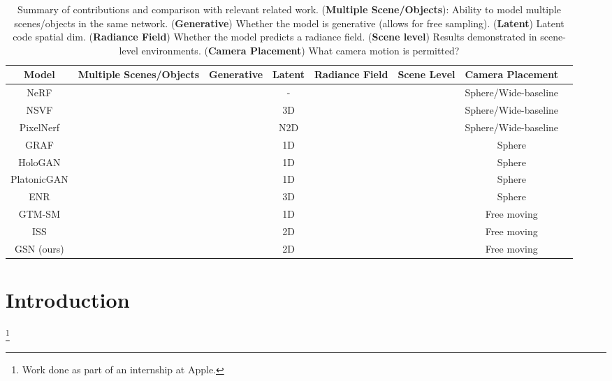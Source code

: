 \documentclass[10pt,twocolumn,letterpaper]{article}
\newcommand{\cmark}{\ding{51}}
\newcommand{\xmark}{\ding{55}}
\newcommand\blfootnote[1]{
  \begingroup
  \renewcommand\thefootnote{}\footnote{#1}
  \addtocounter{footnote}{-1}
  \endgroup
}
\begin{document}
\begin{table*}[t]
\small
    \centering
    \begin{tabular}{cccccccc}
    \toprule
    Model & Multiple Scenes/Objects & Generative & Latent  & Radiance Field & Scene Level & Camera Placement\\
    \midrule 

    NeRF \cite{nerf} & \xmark & \xmark & - & \cmark & \cmark & Sphere/Wide-baseline\\ 
    NSVF \cite{nsvf} & \xmark & \xmark & 3D & \cmark & \cmark & Sphere/Wide-baseline \\ 
    PixelNerf \cite{pixelnerf} & \cmark & \xmark & N2D & \cmark & \cmark & Sphere/Wide-baseline \\
    GRAF \cite{graf} & \cmark & \cmark & 1D & \cmark & \xmark & Sphere  \\ 
    HoloGAN \cite{hologan} & \cmark & \cmark & 1D & \xmark & \xmark & Sphere \\ 
    PlatonicGAN \cite{platonicgan} & \cmark & \xmark & 1D & \xmark & \xmark & Sphere \\ 
    ENR \cite{enr} & \cmark & \xmark  & 3D & \xmark & \xmark & Sphere \\ 
    GTM-SM \cite{gtmsm} & \cmark & \cmark & 1D & \xmark & \cmark & Free moving\\ 
    ISS \cite{iss} & \cmark & \xmark & 2D & \xmark & \cmark & Free moving\\ 
    GSN (ours)  & \cmark & \cmark & 2D & \cmark & \cmark & Free moving\\ 
    \bottomrule
    \end{tabular}
    \caption{Summary of contributions and comparison with relevant related work. (\textbf{Multiple Scene/Objects}): Ability to model multiple scenes/objects in the same network. (\textbf{Generative}) Whether the model is generative (\eg allows for free sampling).  (\textbf{Latent}) Latent code spatial dim. (\textbf{Radiance Field}) Whether the model predicts a radiance field. (\textbf{Scene level}) Results demonstrated in scene-level environments. (\textbf{Camera Placement}) What camera motion is permitted?}
    \label{tab:contributions}
\end{table*}
\section{Introduction}
\vspace{-1em}

\blfootnote{ Work done as part of an internship at Apple.}
\end{document}
